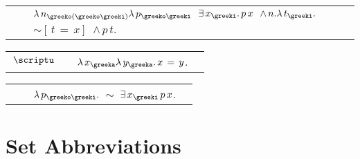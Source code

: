 \begin{description}
\item[SUCC]  \begin{tabular}{l l l l}
&&\texttt{$ \lambda \,n_{\greeko(\greeko\greeki)} \lambda \,p_{\greeko\greeki} $ $\exists \,x_{\greeki} . \,p \,x $ $\land \,n . \lambda \,t_{\greeki} . $ $\sim [ \,t \,= \,x ] $ $\land \,p \,t$}. \\ 
\end{tabular}

\item[UNITSET]  \begin{tabular}{l l l l}
\texttt{$\,\scriptu$}&&\texttt{$ \lambda \,x_{\greeka} \lambda \,y_{\greeka} . \,x \,= \,y$}. \\ 
\end{tabular}

\item[ZERO]  \begin{tabular}{l l l l}
&&\texttt{$ \lambda \,p_{\greeko\greeki} . $ $\sim $ $\exists \,x_{\greeki} \,p \,x$}. \\ 
\end{tabular}
\item
\end{description}

\section{Set Abbreviations}


